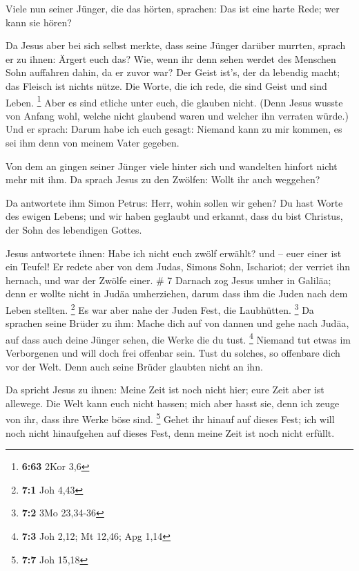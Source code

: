  Viele nun seiner Jünger, die das hörten, sprachen: Das ist
eine harte Rede; wer kann sie hören?

 Da Jesus aber bei sich selbst merkte, dass seine Jünger
darüber murrten, sprach er zu ihnen: Ärgert euch das?  Wie,
wenn ihr denn sehen werdet des Menschen Sohn auffahren dahin, da er
zuvor war?  Der Geist ist's, der da lebendig macht; das
Fleisch ist nichts nütze. Die Worte, die ich rede, die sind Geist und
sind Leben. \footnote{\textbf{6:63} 2Kor 3,6}  Aber es sind
etliche unter euch, die glauben nicht. (Denn Jesus wusste von Anfang
wohl, welche nicht glaubend waren und welcher ihn verraten würde.)
 Und er sprach: Darum habe ich euch gesagt: Niemand kann zu
mir kommen, es sei ihm denn von meinem Vater gegeben.

 Von dem an gingen seiner Jünger viele hinter sich und
wandelten hinfort nicht mehr mit ihm.  Da sprach Jesus zu
den Zwölfen: Wollt ihr auch weggehen?

 Da antwortete ihm Simon Petrus: Herr, wohin sollen wir
gehen? Du hast Worte des ewigen Lebens;  und wir haben
geglaubt und erkannt, dass du bist Christus, der Sohn des lebendigen
Gottes.

 Jesus antwortete ihnen: Habe ich nicht euch zwölf erwählt?
und -- euer einer ist ein Teufel!  Er redete aber von dem
Judas, Simons Sohn, Ischariot; der verriet ihn hernach, und war der
Zwölfe einer. \# 7  Darnach zog Jesus umher in Galiläa; denn
er wollte nicht in Judäa umherziehen, darum dass ihm die Juden nach dem
Leben stellten. \footnote{\textbf{7:1} Joh 4,43}  Es war
aber nahe der Juden Fest, die Laubhütten. \footnote{\textbf{7:2} 3Mo
  23,34-36}  Da sprachen seine Brüder zu ihm: Mache dich auf
von dannen und gehe nach Judäa, auf dass auch deine Jünger sehen, die
Werke die du tust. \footnote{\textbf{7:3} Joh 2,12; Mt 12,46; Apg 1,14}
 Niemand tut etwas im Verborgenen und will doch frei
offenbar sein. Tust du solches, so offenbare dich vor der Welt.
 Denn auch seine Brüder glaubten nicht an ihn.

 Da spricht Jesus zu ihnen: Meine Zeit ist noch nicht hier;
eure Zeit aber ist allewege.  Die Welt kann euch nicht
hassen; mich aber hasst sie, denn ich zeuge von ihr, dass ihre Werke
böse sind. \footnote{\textbf{7:7} Joh 15,18}  Gehet ihr
hinauf auf dieses Fest; ich will noch nicht hinaufgehen auf dieses Fest,
denn meine Zeit ist noch nicht erfüllt.

